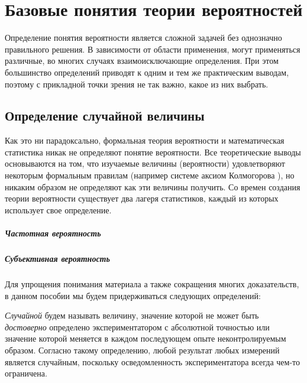 \chapter{Базовые понятия теории вероятностей}

Определение понятия вероятности является сложной задачей без однозначно правильного решения. В зависимости от области применения, могут применяться различные, во многих случаях взаимоисключающие определения. При этом большинство определений приводят к одним и тем же практическим выводам, поэтому с прикладной точки зрения не так важно, какое из них выбрать. 

\section{Определение случайной величины}

Как это ни парадоксально, формальная теория вероятности и математическая статистика никак не определяют понятие вероятности. Все теоретические выводы основываются на том, что изучаемые величины (вероятности) удовлетворяют некоторым формальным правилам (например системе аксиом Колмогорова ), но никаким образом не определяют как эти величины получить. Со времен создания теории вероятности существует два лагеря статистиков, каждый из которых использует свое определение.

\paragraph{Частотная вероятность}

\paragraph{Субъективная вероятность}

Для упрощения понимания материала а также сокращения многих доказательств, в данном пособии мы будем придерживаться следующих определений:

\emph{Случайной} будем называть величину, значение которой не может быть \emph{достоверно} определено экспериментатором с абсолютной точностью или значение которой меняется в каждом последующем опыте неконтролируемым образом. Согласно такому определению, любой результат любых измерений является случайным, поскольку осведомленность экспериментатора всегда чем-то ограничена.

